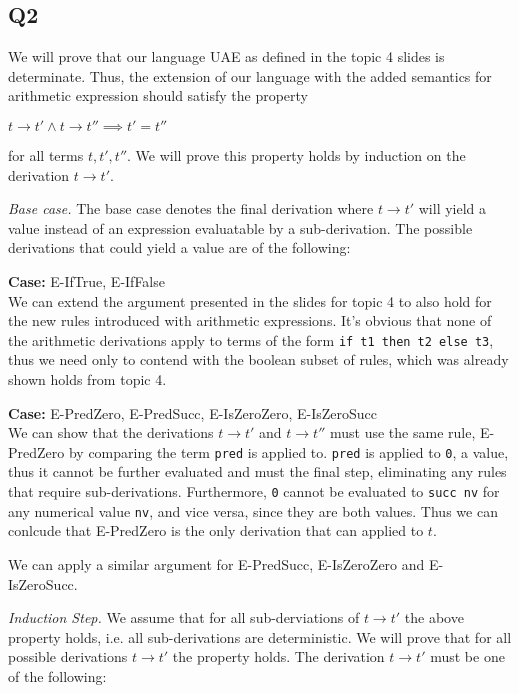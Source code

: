 \documentclass[12pt, fleqn]{article}
\begin{document}
\subsection{Q2}

We will prove that our language UAE as defined in the topic 4 slides is determinate. Thus, the
extension of our language with the added semantics for arithmetic expression should satisfy the property
\begin{center}
    $t \rightarrow t' \land t \rightarrow t'' \implies t' = t''$
\end{center}
for all terms $t,t',t''$.
We will prove this property holds by induction on the derivation $t \rightarrow t'$.

\medskip
\emph{Base case.} The base case denotes the final derivation where $t \rightarrow t'$ will yield a value instead
of an expression evaluatable by a sub-derivation. The possible derivations that could yield a value are of the following:

\medskip
\textbf{Case:} E-IfTrue, E-IfFalse\\
We can extend the argument presented in the slides for topic 4 to also hold for the new rules introduced with arithmetic
expressions. It's obvious that none of the arithmetic derivations apply to terms of the form \verb|if t1 then t2 else t3|, thus
we need only to contend with the boolean subset of rules, which was already shown holds from topic 4.

\medskip
\textbf{Case:} E-PredZero, E-PredSucc, E-IsZeroZero, E-IsZeroSucc\\
We can show that the derivations $t \rightarrow t'$ and $t \rightarrow t''$ must use the same rule, E-PredZero by comparing
the term \verb|pred| is applied to. \verb|pred| is applied to \verb|0|, a value, thus it cannot be further evaluated and must the
final step, eliminating any rules that require sub-derivations. Furthermore, \verb|0| cannot be evaluated to \verb|succ nv| for any
numerical value \verb|nv|, and vice versa, since they are both values. Thus we can conlcude that E-PredZero is the only derivation that can
applied to $t$.

We can apply a similar argument for E-PredSucc, E-IsZeroZero and E-IsZeroSucc.

\medskip
\emph{Induction Step.} We assume that for all sub-derviations of $t \rightarrow t'$ the above property holds, i.e.
all sub-derivations are deterministic. We will prove that for all possible derivations $t \rightarrow t'$ the property holds.
The derivation $t \rightarrow t'$ must be one of the following:
\end{document}
